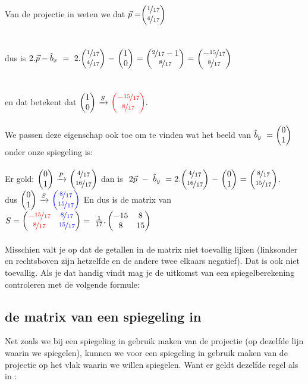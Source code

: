 \documentclass[hidelinks, a4wide, 12pt,  twoside]{book}
\begin{document}
Van de projectie in \RT weten we dat 
$ \vec{p} = \vectwee{ \nicefrac{1}{17} } { \nicefrac{4}{17} } \  $ \\ \\ \\dus is 
$ 2.\vec{p} -  \hat{b}_x
\  =  \   2.  \vectwee{ \nicefrac{1}{17} } { \nicefrac{4}{17} } \ - \ \vectwee{1}{0} 
\ = \    \vectwee{ \nicefrac{2}{17} -1 } {\nicefrac{8}{17}} 
\ = \    \vectwee{ -\nicefrac{15}{17} } {\nicefrac{8}{17}} 
$ \\ \\ \\
en dat betekent dat   $ \vectwee{1}{0}  \  \xrightarrow{S}   
\  \vectwee[red]{ -\nicefrac{15}{17} } {\nicefrac{8}{17}} . $ \\ \\
We passen deze eigenschap ook toe om te vinden wat het beeld van  $  \hat{b}_y\ = \ \vectwee{0}{1} $ onder onze spiegeling is:\\ \\
Er gold:  $ \vectwee{0}{1}   \  \xrightarrow{P}  \ 
\vectwee{\nicefrac{4} {17} } {\nicefrac {16} {17}} $
\qquad  dan is $  \  2\vec{p} \ - \  \hat{b}_y \ 
= 2 .\vectwee{ \nicefrac {4} {17} } { \nicefrac {16} {17}} \ - \ \vectwee{0}{1}  \ 
= \  \vectwee{\nicefrac{8}{17} } {\nicefrac{15}{17}}  $. \\

\quad dus  $ \vectwee{0}{1}   \  \xrightarrow{S}  \
\vectwee[blue]{\nicefrac{8}{17} } {\nicefrac{15}{17} } $ 
\quad \quad En dus is de matrix van 
$ S = \begin{pmatrix}  
	{\color{red} - \nicefrac{15}{17}} & { \color{blue}\nicefrac{8}{17}}  \\  {\color{red} \nicefrac{8}{17} } & { \color{blue} \nicefrac{15}{17} }  \end{pmatrix} 
 = \ \frac{1}{17} .  \begin{pmatrix} -15&8 \\ 8&15 \end{pmatrix} $\\ \\
Misschien valt je op dat de getallen in de matrix niet toevallig lijken (linksonder en rechtsboven zijn hetzelfde en de andere twee elkaars negatief). Dat is ook niet toevallig. Als je dat handig vindt mag je de uitkomst van een spiegelberekening controleren met de volgende formule:\\


\subsection{de matrix van een spiegeling in \RD}
Net zoals we bij een spiegeling in \RT gebruik maken van de projectie (op dezelfde lijn waarin we spiegelen), kunnen we voor een spiegeling in \RD gebruik maken van de projectie op het vlak waarin we willen spiegelen. Want er geldt dezelfde regel als in \RT:\\ \\
\end{document}
